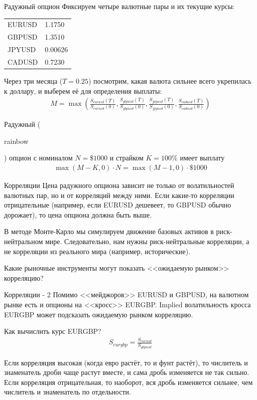 \documentclass{beamer}
\newcommand{\en}[1]{\begin{otherlanguage}{english}#1\end{otherlanguage}}
\begin{document}
\begin{frame}{Радужный опцион}
\justify
Фиксируем четыре валютные пары и их текущие курсы:

\centering
\begin{tabular}{l|l}
EURUSD & 1.1750 \\
GBPUSD & 1.3510 \\
JPYUSD & 0.00626 \\
CADUSD & 0.7230
\end{tabular}

\justify
Через три месяца ($T=0.25$) посмотрим, какая валюта сильнее всего укрепилась к доллару, и выберем её для определения выплаты:
\begin{align*}
M = \max\left(\frac{S_{eurusd}(T)}{S_{eurusd}(0)}, \frac{S_{gbpusd}(T)}{S_{gbpusd}(0)}, \frac{S_{jpyusd}(T)}{S_{jpyusd}(0)}, \frac{S_{cadusd}(T)}{S_{cadusd}(0)} \right)
\end{align*}

\justify 
Радужный (\en{rainbow}) опцион с номиналом $N=\$1000$ и страйком $K=100\%$ имеет выплату
\begin{align*}
\max(M - K, 0) \cdot N = \max(M-1, 0) \cdot \$1000
\end{align*}
\end{frame}



\begin{frame}{Корреляции}
\justify
Цена радужного опциона зависит не только от волатильностей валютных пар, но и от корреляций между ними. Если какие-то корреляции отрицательные (например, если EURUSD дешевеет, то GBPUSD обычно дорожает), то цена опциона должна быть выше.

\justify
В методе Монте-Карло мы симулируем движение базовых активов в риск-нейтральном мире. Следовательно, нам нужны риск-нейтральные корреляции, а не корреляции из реального мира (например, исторические).

\justify
Какие рыночные инструменты могут показать <<ожидаемую рынком>> корреляцию?
\end{frame}



\begin{frame}{Корреляции - 2}
\justify
Помимо <<мейджоров>> EURUSD и GBPUSD, на валютном рынке есть и опционы на <<кросс>> EURGBP. Implied волатильность кросса EURGBP может подсказать ожидаемую рынком корреляцию.

\justify
Как вычислить курс EURGBP?
\begin{align*}
S_{eurgbp} = \frac{S_{eurusd}}{S_{gbpusd}}
\end{align*}

\justify
Если корреляция высокая (когда евро растёт, то и фунт растёт), то числитель и знаменатель дроби чаще растут вместе, и сама дробь изменяется не так сильно. Если корреляция отрицательная, то наоборот, вся дробь изменяется сильнее, чем числитель и знаменатель по отдельности.
\end{frame}
\end{document}
